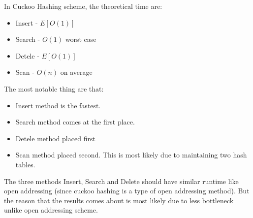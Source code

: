 \documentclass{article} %
\begin{document}
    In Cuckoo Hashing scheme, the theoretical time are:
    \begin{itemize}
        \item Insert - $E[O(1)]$
        \item Search - $O(1)$ worst case
        \item Detele - $E[O(1)]$
        \item Scan - $O(n)$ on average
    \end{itemize}
    The most notable thing are that:
    \begin{itemize}
        \item Insert method is the fastest.
        \item Search method comes at the first place.
        \item Detele method placed first
        \item Scan method placed second.
        This is most likely due to maintaining two hash tables.
    \end{itemize}
    The three methods Insert, Search and Delete should have similar runtime like open addressing (since cuckoo hashing is a type of open addressing method).
    But the reason that the results comes about is most likely due to less bottleneck unlike open addressing scheme.
\end{document}
